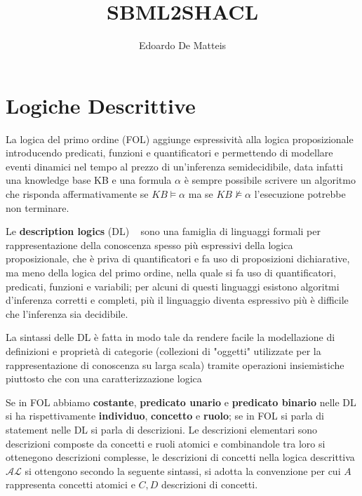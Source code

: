 \documentclass{article}
\title{SBML2SHACL}
\author{Edoardo De Matteis}
\begin{document}
\maketitle
\tableofcontents

\clearpage
\section{Logiche Descrittive} \label{sec:dl}
La logica del primo ordine (FOL) aggiunge espressività alla logica proposizionale introducendo predicati, funzioni e quantificatori e permettendo di modellare eventi dinamici nel tempo al prezzo di un'inferenza semidecidibile, data infatti una knowledge base KB e una formula $\alpha$ è sempre possibile scrivere un algoritmo che risponda affermativamente se $KB \models \alpha$ ma se $KB \nvDash \alpha$ l'esecuzione potrebbe non terminare. 

Le \textbf{description logics} (DL) ~\cite{dl:handbook} sono una famiglia di linguaggi formali per rappresentazione della conoscenza spesso più espressivi della logica proposizionale, che è priva di quantificatori e fa uso di proposizioni dichiarative, ma meno della logica del primo ordine, nella quale si fa uso di quantificatori, predicati, funzioni e variabili; per alcuni di questi linguaggi esistono algoritmi d'inferenza corretti e completi, più il linguaggio diventa espressivo più è difficile che l'inferenza sia decidibile. 

La sintassi delle DL è fatta in modo tale da rendere facile la modellazione di definizioni e proprietà di categorie (collezioni di "oggetti" utilizzate per la rappresentazione di conoscenza su larga scala) tramite operazioni insiemistiche piuttosto che con una caratterizzazione logica 

Se in FOL abbiamo \textbf{costante}, \textbf{predicato unario} e \textbf{predicato binario} nelle DL si ha rispettivamente \textbf{individuo}, \textbf{concetto} e \textbf{ruolo}; se in FOL si parla di statement nelle DL si parla di descrizioni. Le descrizioni elementari sono descrizioni composte da concetti e ruoli atomici e combinandole tra loro si ottenegono descrizioni complesse, le descrizioni di concetti nella logica descrittiva $ \mathcal{AL} $ si ottengono secondo la seguente sintassi, si adotta la convenzione per cui $ A $ rappresenta concetti atomici e $ C, D $ descrizioni di concetti.
\end{document}
